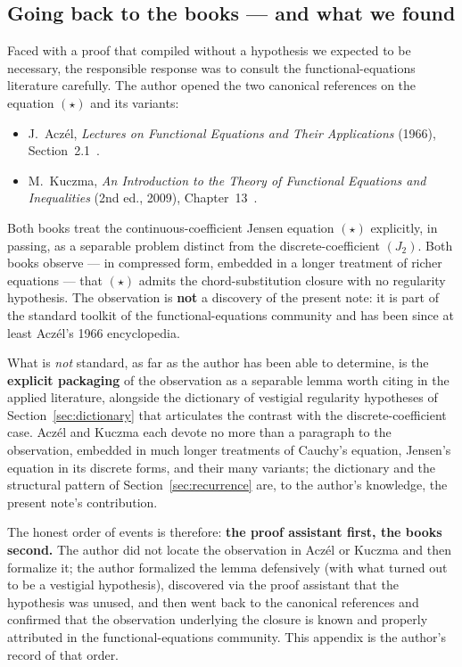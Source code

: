 \documentclass[review,12pt,a4paper]{elsarticle}
\theoremstyle{remark}
\begin{document}
\subsection{Going back to the books --- and what we found}

Faced with a proof that compiled without a hypothesis we expected to be
necessary, the responsible response was to consult the
functional-equations literature carefully. The author opened the two
canonical references on the equation $(\star)$ and its variants:

\begin{itemize}
\item J.~Acz\'el, \emph{Lectures on Functional Equations and Their
      Applications} (1966), Section~2.1~\cite{Aczel1966}.
\item M.~Kuczma, \emph{An Introduction to the Theory of Functional
      Equations and Inequalities} (2nd ed., 2009),
      Chapter~13~\cite{Kuczma2009}.
\end{itemize}

Both books treat the continuous-coefficient Jensen equation $(\star)$
explicitly, in passing, as a separable problem distinct from the
discrete-coefficient $(J_2)$. Both books observe --- in compressed form,
embedded in a longer treatment of richer equations --- that $(\star)$
admits the chord-substitution closure with no regularity hypothesis.
The observation is \textbf{not} a discovery of the present note: it is
part of the standard toolkit of the functional-equations community and
has been since at least Acz\'el's 1966 encyclopedia.

What is \emph{not} standard, as far as the author has been able to
determine, is the \textbf{explicit packaging} of the observation as a
separable lemma worth citing in the applied literature, alongside the
dictionary of vestigial regularity hypotheses of Section~\ref{sec:dictionary}
that articulates the contrast with the discrete-coefficient case.
Acz\'el and Kuczma each devote no more than a paragraph to the
observation, embedded in much longer treatments of Cauchy's equation,
Jensen's equation in its discrete forms, and their many variants; the
dictionary and the structural pattern of Section~\ref{sec:recurrence}
are, to the author's knowledge, the present note's contribution.

The honest order of events is therefore: \textbf{the proof assistant
first, the books second.} The author did not locate the observation in
Acz\'el or Kuczma and then formalize it; the author formalized the lemma
defensively (with what turned out to be a vestigial hypothesis),
discovered via the proof assistant that the hypothesis was unused, and
then went back to the canonical references and confirmed that the
observation underlying the closure is known and properly attributed in
the functional-equations community. This appendix is the author's record
of that order.
\end{document}
